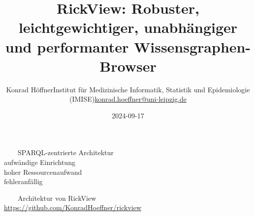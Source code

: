 \documentclass[14pt,aspectratio=169]{beamer}
\date{2024-09-17}
\author{\texorpdfstring{Konrad Höffner\newline{}Institut für Medizinische Informatik, Statistik und Epidemiologie (IMISE)\newline{}\url{konrad.hoeffner@uni-leipzig.de}}{Konrad Höffner}}
\title{RickView: Robuster, leichtgewichtiger, unabhängiger und performanter Wissensgraphen-Browser}
\subtitle{}
\newcommand{\imageslide}[4][]
{
\begin{frame}[plain]{~~~~#2}
\vspace{0.2em}
\centering\makebox[\linewidth]{\texttt{[image: \#3]}}
\\#1
\note{#4}
\end{frame}
}
\begin{document}

\begin{frame}[plain]
\centering{}
\end{frame}

\imageslide[aufwändige Einrichtung\\hoher Ressourcenaufwand\\fehleranfällig]{SPARQL-zentrierte Architektur}{img/architecture.pdf}{}
\imageslide[\url{https://github.com/KonradHoeffner/rickview}]{Architektur von RickView}{img/architecture-simple.pdf}{}
\end{document}
